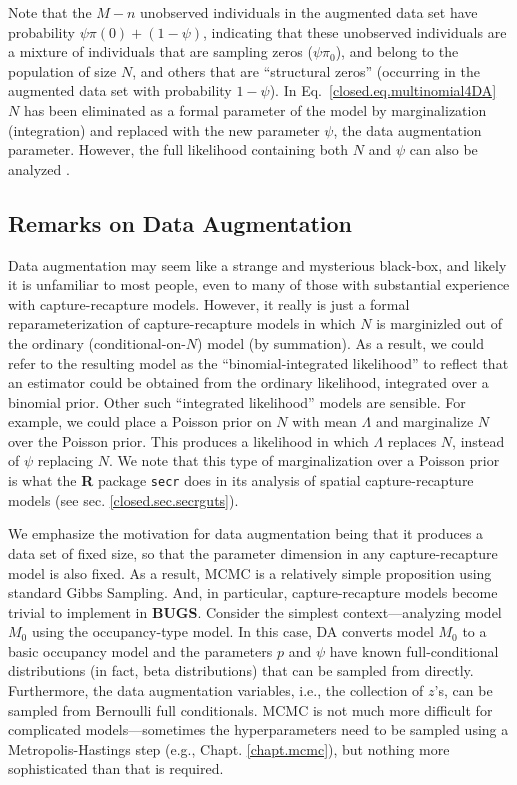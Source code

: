 Note that the $M-n$ unobserved individuals in the augmented data set
have probability $\psi \pi(0) + (1-\psi)$, indicating that these
unobserved individuals are a mixture of individuals that are sampling
zeros ($\psi \pi_0$), and belong to the population of size $N$, and
others that are ``structural zeros'' (occurring in the augmented data
set with probability $1 - \psi$). In Eq.~\ref{closed.eq.multinomial4DA} $N$
has been eliminated as a formal parameter of the model by
marginalization (integration) and replaced with the new parameter
$\psi$, the data augmentation parameter.
However, the full likelihood containing both $N$ and $\psi$ can also be
analyzed \citep[see][]{royle_etal:2007}.


\subsection{Remarks on Data Augmentation}
\label{closed.sec.remarks}

Data augmentation may seem like a strange and mysterious black-box,
and likely it is unfamiliar to most people, even to many of those with substantial
experience with capture-recapture models. However, it really is just a
formal reparameterization of capture-recapture models in which $N$ is
marginizled out of the ordinary (conditional-on-$N$) model (by summation).
As a result, we could refer to the resulting model as the 
``binomial-integrated likelihood'' to reflect that an estimator could
be obtained from the ordinary likelihood, integrated over a binomial
prior. Other such ``integrated likelihood'' models are sensible. For
example, we could place a Poisson prior on $N$ with mean $\Lambda$ and
marginalize $N$ over the Poisson prior. This produces a likelihood in
which $\Lambda$ replaces $N$, instead of $\psi$ replacing $N$.  We
note that this type of marginalization over a Poisson prior is what
the {\bf R} package \mbox{\tt secr} does in its analysis of spatial
capture-recapture models (see sec. \ref{closed.sec.secrguts}).


We emphasize the motivation for data augmentation being that it
produces a data set of fixed size, so that the parameter dimension in
any capture-recapture model is also fixed.  As a result, MCMC is a
relatively simple proposition using standard Gibbs Sampling.  And, in
particular, capture-recapture models become trivial to implement in
{\bf BUGS}. Consider
the simplest context---analyzing model $M_0$ using the occupancy-type
model. In this case, DA converts model $M_0$ to a basic occupancy model
and the parameters $p$ and $\psi$ have known full-conditional
distributions (in fact, beta distributions) that can be sampled from
directly.  Furthermore, the data augmentation variables, i.e., the collection
of $z$'s, can be sampled from Bernoulli full
conditionals. MCMC is not much more difficult for complicated
models---sometimes the hyperparameters need to be sampled using a
Metropolis-Hastings step (e.g., Chapt. \ref{chapt.mcmc}), but nothing more sophisticated than that is
required.

